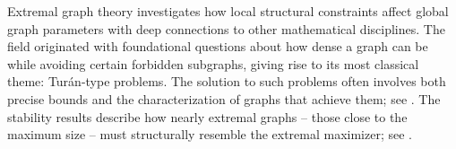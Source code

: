 \documentclass[11pt,a4paper]{article}
\theoremstyle{definition}
\theoremstyle{remark}
\begin{document}
Extremal graph theory investigates how local structural constraints affect global graph parameters with deep connections to other mathematical disciplines. The field originated with foundational questions about how dense a graph can be while avoiding certain forbidden subgraphs, giving rise to its most classical theme: Tur\'{a}n-type problems. The solution to such problems often involves both precise bounds and the characterization of graphs that achieve them; see  \cite{Bollobas78,FS13,Sim2013,GTAC}. 
The stability results describe how nearly extremal graphs -- those close to the maximum size -- must structurally resemble the extremal maximizer; see \cite{Sim1966}. %




\end{document}

